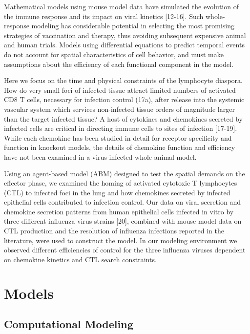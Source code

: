 \documentclass[10pt]{article}
\begin{document}
Mathematical models using mouse model data have simulated the evolution of the immune response and its impact on viral kinetics [12-16].  Such whole-response modeling has considerable potential in selecting the most promising strategies of vaccination and therapy, thus avoiding subsequent expensive animal and human trials.    Models using differential equations to predict temporal events do not account for spatial characteristics of cell behavior, and must make assumptions about the efficiency of each functional component in the model.   

Here we focus on the time and physical constraints of the lymphocyte diaspora.  How do very small foci of infected tissue attract limited numbers of activated CD8 T cells, necessary for infection control (17a), after release into the systemic vascular system which services non-infected tissue orders of magnitude larger than the target infected tissue?  A host of cytokines and chemokines secreted by infected cells are critical in directing immune cells to sites of infection [17-19].  While each chemokine has been studied in detail for receptor specificity and function in knockout models, the details of chemokine function and efficiency have not been examined in a virus-infected whole animal model.

Using an agent-based model (ABM) designed to test the spatial demands on the effector phase, we examined the homing of activated cytotoxic T lymphocytes (CTL) to infected foci in the lung and how chemokines secreted by infected epithelial cells contributed to infection control.   Our data on viral secretion and chemokine secretion patterns from human epithelial cells infected in vitro by three different influenza virus strains [20], combined with mouse model data on CTL production and the resolution of influenza infections reported in the literature, were used to construct the model. In our modeling environment we observed different efficiencies of control for the three influenza viruses dependent on chemokine kinetics and CTL search constraints.

\section*{Models}

\subsection*{Computational Modeling}
\end{document}
